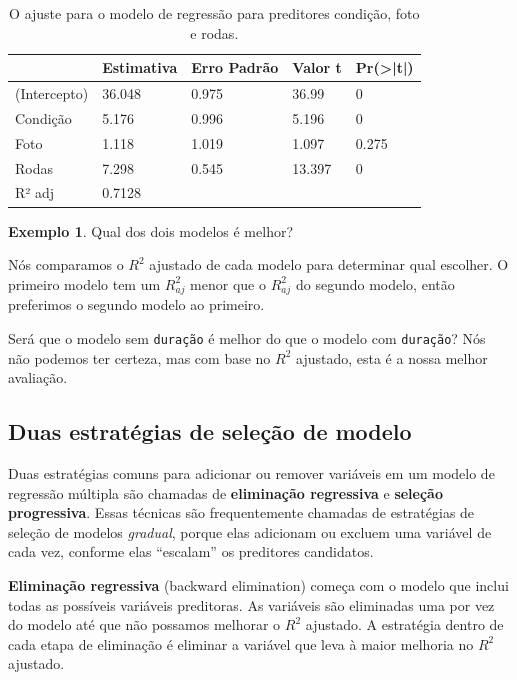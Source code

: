 \documentclass[
]{book}
\theoremstyle{definition}
\theoremstyle{definition}
\newtheorem{example}{Exemplo}[chapter]
\theoremstyle{definition}
\theoremstyle{definition}
\theoremstyle{remark}
\begin{document}
\begin{table}

\caption{\label{tab:marioKartMultipleRegressionModelAllButDuration}O ajuste para o modelo de regressão para preditores condição, foto e rodas.}
\centering
\begin{tabular}[t]{l|l|l|l|l}
\hline
  & Estimativa & Erro Padrão & Valor t & Pr(>|t|)\\
\hline
(Intercepto) & 36.048 & 0.975 & 36.99 & 0\\
\hline
Condição & 5.176 & 0.996 & 5.196 & 0\\
\hline
Foto & 1.118 & 1.019 & 1.097 & 0.275\\
\hline
Rodas & 7.298 & 0.545 & 13.397 & 0\\
\hline
R² adj & 0.7128 &  &  & \\
\hline
\end{tabular}
\end{table}

\begin{example}
\protect\hypertarget{exm:unnamed-chunk-291}{}{\label{exm:unnamed-chunk-291} }Qual dos dois modelos é melhor?
\end{example}

Nós comparamos o \(R^2\) ajustado de cada modelo para determinar qual escolher. O primeiro modelo tem um \(R^2_{aj}\) menor que o \(R^2_{aj}\) do segundo modelo, então preferimos o segundo modelo ao primeiro.

Será que o modelo sem \texttt{duração} é melhor do que o modelo com \texttt{duração}? Nós não podemos ter certeza, mas com base no \(R^2\) ajustado, esta é a nossa melhor avaliação.

\hypertarget{twoStrategies}{%
\subsection{Duas estratégias de seleção de modelo}\label{twoStrategies}}

Duas estratégias comuns para adicionar ou remover variáveis em um modelo de regressão múltipla são chamadas de \textbf{eliminação regressiva} e \textbf{seleção progressiva}. Essas técnicas são frequentemente chamadas de estratégias de seleção de modelos \emph{gradual}, porque elas adicionam ou excluem uma variável de cada vez, conforme elas ``escalam'' os preditores candidatos.

\textbf{Eliminação regressiva} (backward elimination) começa com o modelo que inclui todas as possíveis variáveis preditoras. As variáveis são eliminadas uma por vez do modelo até que não possamos melhorar o \(R^2\) ajustado. A estratégia dentro de cada etapa de eliminação é eliminar a variável que leva à maior melhoria no \(R^2\) ajustado.
\end{document}
